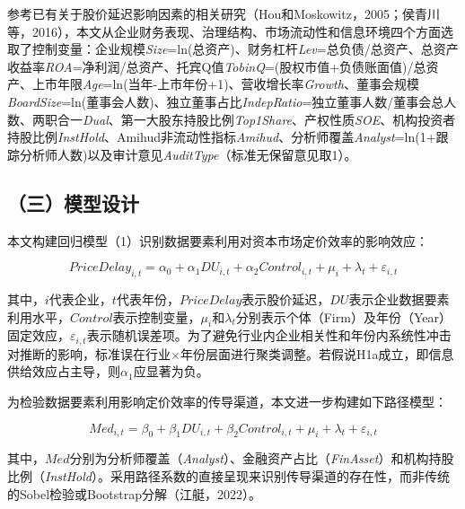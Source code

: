 \documentclass[11pt,a4paper]{article}
\begin{document}
\vspace{2pt}

参考已有关于股价延迟影响因素的相关研究（Hou和Moskowitz，2005；侯青川等，2016），本文从企业财务表现、治理结构、市场流动性和信息环境四个方面选取了控制变量：企业规模\textit{Size}=ln(总资产)、财务杠杆\textit{Lev}=总负债/总资产、总资产收益率\textit{ROA}=净利润/总资产、托宾Q值\textit{TobinQ}=(股权市值+负债账面值)/总资产、上市年限\textit{Age}=ln(当年-上市年份+1)、营收增长率\textit{Growth}、董事会规模\textit{BoardSize}=ln(董事会人数)、独立董事占比\textit{IndepRatio}=独立董事人数/董事会总人数、两职合一\textit{Dual}、第一大股东持股比例\textit{Top1Share}、产权性质\textit{SOE}、机构投资者持股比例\textit{InstHold}、Amihud非流动性指标\textit{Amihud}、分析师覆盖\textit{Analyst}=ln(1+跟踪分析师人数)以及审计意见\textit{AuditType}（标准无保留意见取1）。

\subsection*{（三）模型设计}

本文构建回归模型（1）识别数据要素利用对资本市场定价效率的影响效应：

\begin{equation}
PriceDelay_{i,t} = \alpha_0 + \alpha_1 DU_{i,t} + \alpha_2 Control_{i,t} + \mu_i + \lambda_t + \varepsilon_{i,t} \tag{1}
\end{equation}

其中，$i$代表企业，$t$代表年份，$PriceDelay$表示股价延迟，$DU$表示企业数据要素利用水平，$Control$表示控制变量，$\mu_i$和$\lambda_t$分别表示个体（Firm）及年份（Year）固定效应，$\varepsilon_{i,t}$表示随机误差项。为了避免行业内企业相关性和年份内系统性冲击对推断的影响，标准误在行业$\times$年份层面进行聚类调整。若假说H1a成立，即信息供给效应占主导，则$\alpha_1$应显著为负。

为检验数据要素利用影响定价效率的传导渠道，本文进一步构建如下路径模型：

\begin{equation}
Med_{i,t} = \beta_0 + \beta_1 DU_{i,t} + \beta_2 Control_{i,t} + \mu_i + \lambda_t + \varepsilon_{i,t} \tag{2}
\end{equation}

其中，$Med$分别为分析师覆盖（\textit{Analyst}）、金融资产占比（\textit{FinAsset}）和机构持股比例（\textit{InstHold}）。采用路径系数的直接呈现来识别传导渠道的存在性，而非传统的Sobel检验或Bootstrap分解（江艇，2022）。

\vspace{8pt}
\end{document}
